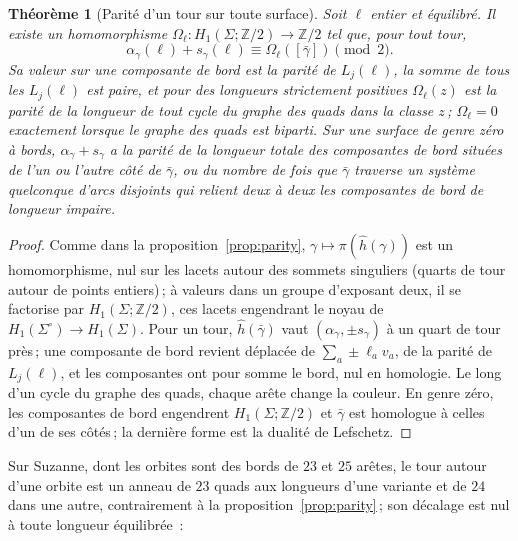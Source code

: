 \documentclass[11pt,a4paper]{article}
\newtheorem{theorem}{Théorème}
\newcommand{\Z}{\mathbb{Z}}
\newcommand{\shift}{s}
\newcommand{\lean}[1]{\texttt{\detokenize{#1}}}
\newenvironment{evidence}[3][]{}{}
\begin{document}
\begin{evidence}{core}{\lean{parity_any_surface}, \lean{colour_comp_trans}, \lean{colour_rotAbout_trans}, \lean{colour_border}, \lean{colour_turn}\,; testé~: 2\,027 strips de graphes quad bipartis et 1\,960 couronnes de 50 instances aléatoires\,; supposé~: que $\pi \circ \hat h$ passe au quotient $H_1(\Sigma\,; \Z/2)$, et que sa valeur sur une classe est la parité de la longueur d'un cycle du graphe quad dans cette classe}
\begin{theorem}[Parité d'un tour sur toute surface]\label{thm:parity-any}
Soit $\ell$ entier et équilibré. Il existe un homomorphisme
$\Omega_\ell\colon H_1(\Sigma; \Z/2) \to \Z/2$ tel que, pour tout tour,
\[
  \alpha_\gamma(\ell) + \shift_\gamma(\ell) \equiv \Omega_\ell([\bar\gamma]) \pmod 2 .
\]
Sa valeur sur une composante de bord est la parité de $L_j(\ell)$, la somme de
tous les $L_j(\ell)$ est paire, et pour des longueurs strictement positives
$\Omega_\ell(z)$ est la parité de la longueur de tout cycle du graphe des
quads dans la classe $z$\,; $\Omega_\ell = 0$ exactement lorsque le graphe des
quads est biparti. Sur une surface de genre zéro à bords, $\alpha_\gamma +
\shift_\gamma$ a la parité de la longueur totale des composantes de bord
situées de l'un ou l'autre côté de $\bar\gamma$, ou du nombre de fois que
$\bar\gamma$ traverse un système quelconque d'arcs disjoints qui relient deux
à deux les composantes de bord de longueur impaire.
\end{theorem}
\end{evidence}
\begin{proof}
Comme dans la proposition~\ref{prop:parity}, $\gamma \mapsto \pi(\hat
h(\gamma))$ est un homomorphisme, nul sur les lacets autour des sommets
singuliers (quarts de tour autour de points entiers)\,; à valeurs dans un
groupe d'exposant deux, il se factorise par $H_1(\Sigma; \Z/2)$, ces lacets
engendrant le noyau de $H_1(\Sigma^\circ) \to H_1(\Sigma)$. Pour un tour,
$\hat h(\bar\gamma)$ vaut $(\alpha_\gamma, \pm\shift_\gamma)$ à un quart de
tour près\,; une composante de bord revient déplacée de $\sum_a \pm\ell_a
v_a$, de la parité de $L_j(\ell)$, et les composantes ont pour somme le bord,
nul en homologie. Le long d'un cycle du graphe des quads, chaque arête change
la couleur. En genre zéro, les composantes de bord engendrent $H_1(\Sigma;
\Z/2)$ et $\bar\gamma$ est homologue à celles d'un de ses côtés\,; la
dernière forme est la dualité de Lefschetz.
\end{proof}

Sur Suzanne, dont les orbites sont des bords de $23$ et $25$ arêtes, le tour
autour d'une orbite est un anneau de $23$ quads aux longueurs d'une variante
et de $24$ dans une autre, contrairement à la proposition~\ref{prop:parity}\,;
son décalage est nul à toute longueur équilibrée~:
\end{document}
